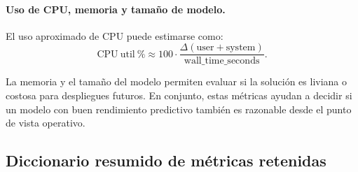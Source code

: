 \documentclass[12pt,oneside]{report}
\begin{document}
\paragraph{Uso de CPU, memoria y tamaño de modelo.}
El uso aproximado de CPU puede estimarse como:
\[
\mathrm{CPU\ util\ \%}\approx 100\cdot \frac{\Delta(\mathrm{user}+\mathrm{system})}{\mathrm{wall\_time\_seconds}}.
\]

La memoria y el tamaño del modelo permiten evaluar si la solución es liviana o costosa para despliegues futuros. En conjunto, estas métricas ayudan a decidir si un modelo con buen rendimiento predictivo también es razonable desde el punto de vista operativo.

\subsection{Diccionario resumido de métricas retenidas}
\end{document}
